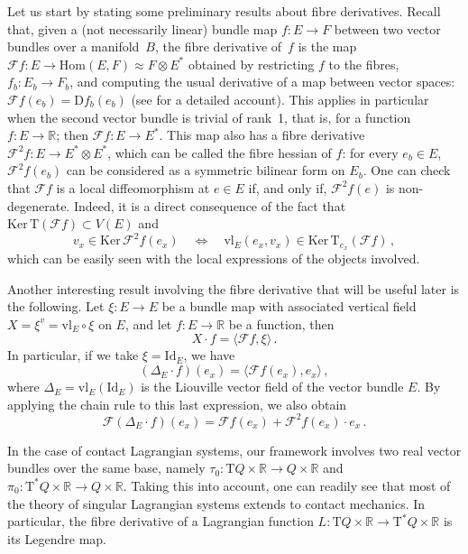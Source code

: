 \documentclass[11pt]{article}
\theoremstyle{plain}
\theoremstyle{definition}
\newcommand{\R}{\mathbb{R}}
\newcommand{\T}{{\mathrm T}}
\let\Tan\T
\newcommand{\cT}{\T^{\ast}}
\newcommand{\Id}{\mathrm{Id}}
\newcommand{\F}{\mathcal{F}}
\def\Ker{\mathrm{Ker \,}}
\def\Tan{\mathrm{T}}
\begin{document}
Let us start by stating some preliminary results about fibre derivatives.
Recall that,
given a (not necessarily linear) bundle map $f \colon E \to F$
between two vector bundles over a manifold~$B$,
the fibre derivative of~$f$ is the map
$\mathcal{F}f \colon 
E \to \mathrm{Hom}(E,F) \approx F \otimes E^*$
obtained by
restricting $f$ to the fibres, 
$f_b \colon E_b \to F_b$,
and computing the usual derivative
of a map between vector spaces:
$\mathcal{F}f(e_b) = \mathrm{D} f_b(e_b)$
(see \cite{Gra_00} for a detailed account).
This applies in particular 
when the second vector bundle is trivial of rank~1,
that is,
for a function
$f \colon E \to \R$;
then
$\mathcal{F}f \colon E \to E^*$.
This map also has a fibre derivative
$\mathcal{F}^2 f \colon E \to E^* \otimes E^*$,
which can be called the fibre hessian of $f$:
for every $e_b \in E$,
$\mathcal{F}^2 f(e_b)$ can be considered as a
symmetric bilinear form on $E_b$.
One can check that
$\mathcal{F}f$ is a local diffeomorphism 
at $e \in E$
if, and only if, $\F^2f(e)$ is non-degenerate.
Indeed, it is a direct consequence of the fact that $\Ker \Tan (\F f) \subset V(E)$ and
$$v_x \in \Ker \F ^2 f(e_x) \quad \Longleftrightarrow \quad \mathrm{vl}_{E}(e_x,v_x) \in \Ker \T_{e_x} (\F f)\,,$$
which can be easily seen with the local expressions of the objects involved.

Another interesting result involving the fibre derivative that will be useful later is the following. Let $\xi \colon E \to E $ be a bundle map with associated vertical field $X= \xi ^v = \mathrm{vl}_E \circ \xi$ on $E$, and let $f \colon E \to \R$ be a function, then
$$X \cdot f = \langle\F f, \xi \rangle\,.$$
In particular, if we take $\xi = \mathrm{Id}_E$, we have
\begin{equation}\label{Liouville_prop_1}
	(\Delta_E \cdot f) (e_x) = \langle \F f(e_x) , e_x \rangle\,,
\end{equation}
where $\Delta_E = \mathrm{vl}_E(\Id_E)$ is the Liouville vector field of the vector bundle $E$. By applying the chain rule to this last expression, we also obtain 
\begin{equation}\label{Liouville_prop_2}
	\F (\Delta_E \cdot f)(e_x) = \F f (e_x)+\F^2 f(e_x)\cdot e_x\,.
\end{equation}

In the case of contact Lagrangian systems, our framework involves two real vector bundles over the same base, namely 
$  \tau_0\colon\Tan Q \times \mathbb{R} \to Q \times \mathbb{R}
$ and $
 \pi_0 \colon \Tan^*Q \times \mathbb{R} \to Q \times \mathbb{R}.$
Taking this into account, one can readily see that most of the theory of singular Lagrangian systems extends to contact mechanics. In particular, the fibre derivative of a Lagrangian function $L\colon\T Q\times\R\to\cT Q\times\R$ is its Legendre map.
\end{document}
